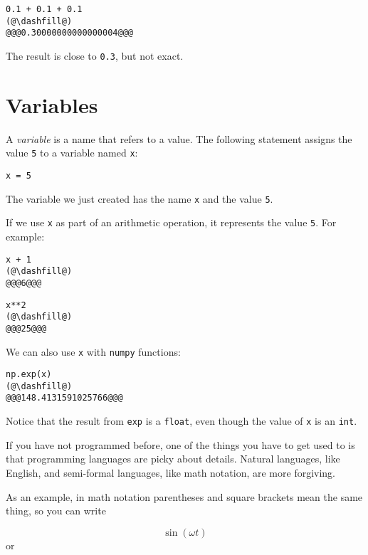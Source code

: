 \begin{lstlisting}[]
0.1 + 0.1 + 0.1
(@\dashfill@)
@@@0.30000000000000004@@@
\end{lstlisting}
The result is close to \passthrough{\lstinline!0.3!}, but not exact.


\hypertarget{variables}{%
\section{Variables}\label{variables}}

A \emph{variable} is a name that refers to a value. The following
statement assigns the value \passthrough{\lstinline!5!} to a variable
named \passthrough{\lstinline!x!}:

\begin{lstlisting}[]
x = 5
\end{lstlisting}

The variable we just created has the name \passthrough{\lstinline!x!}
and the value \passthrough{\lstinline!5!}.

If we use \passthrough{\lstinline!x!} as part of an arithmetic
operation, it represents the value \passthrough{\lstinline!5!}. For example:

\begin{lstlisting}[]
x + 1
(@\dashfill@)
@@@6@@@
\end{lstlisting}

\begin{lstlisting}[]
x**2
(@\dashfill@)
@@@25@@@
\end{lstlisting}

We can also use \passthrough{\lstinline!x!} with
\passthrough{\lstinline!numpy!} functions:

\begin{lstlisting}[]
np.exp(x)
(@\dashfill@)
@@@148.4131591025766@@@
\end{lstlisting}
Notice that the result from \passthrough{\lstinline!exp!} is a
\passthrough{\lstinline!float!}, even though the value of
\passthrough{\lstinline!x!} is an \passthrough{\lstinline!int!}.

If you have not programmed before, one of the things
you have to get used to is that programming languages are picky about
details. Natural languages, like English, and semi-formal languages,
like math notation, are more forgiving.

As an example, in math notation parentheses and square brackets mean
the same thing, so you can write

\[\sin (\omega t)\]
or

